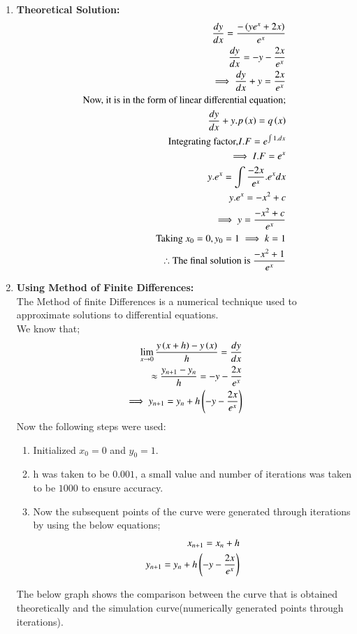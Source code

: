 \documentclass[journal]{IEEEtran}
\begin{document}
\begin{enumerate}
    \item \textbf{Theoretical Solution:}\\ 
    \begin{align}
    \frac{dy}{dx}=\frac{-\left(ye^x+2x\right)}{e^x}\\
    \frac{dy}{dx}=-y-\frac{2x}{e^x}\\
    \implies \frac{dy}{dx}+y=\frac{2x}{e^x}\\
    \text{Now, it is in the form of linear differential equation;}\\
    \frac{dy}{dx}+y.p\left(x\right)=q\left(x\right)\\
    \text{Integrating factor,} I.F=e^{\int1.dx}\\
    \implies I.F=e^x\\
    y.e^x=\int\frac{-2x}{e^x}.e^x dx\\
    y.e^x=-x^2+c\\
    \implies y=\frac{-x^2+c}{e^x}\\
    \text{Taking $x_0=0, y_0=1$}\implies k=1\\
    \therefore \text{The final solution is $\frac{-x^2+1}{e^x}$}
    \end{align}
    \item \textbf{Using Method of Finite Differences:}\\ The Method of finite Differences is a numerical technique used to approximate solutions to differential equations.\\We know that;\\
    \begin{align}
        \lim_{x\to 0}\frac{y\left(x+h\right)-y\left(x\right)}{h}=\frac{dy}{dx}\\
        \approx \frac{y_{n+1}-y_n}{h}=-y-\frac{2x}{e^x}\\
        \implies y_{n+1}=y_n+h\left(-y-\frac{2x}{e^x}\right)\\
    \end{align}
    Now the following steps were used:
    \begin{enumerate}
        \item Initialized $x_0=0$ and $y_0=1$.
        \item h was taken to be $0.001$, a small value and number of iterations was taken to be $1000$ to ensure accuracy.
        \item Now the subsequent points of the curve were generated through iterations by using the below equations;
        \begin{align}
            x_{n+1}=x_n+h\\
            y_{n+1}=y_n+h\left(-y-\frac{2x}{e^x}\right)
        \end{align}
    \end{enumerate}
    The below graph shows the comparison between the curve that is obtained theoretically and the simulation curve(numerically generated points through iterations).
\end{enumerate}
\end{document}
